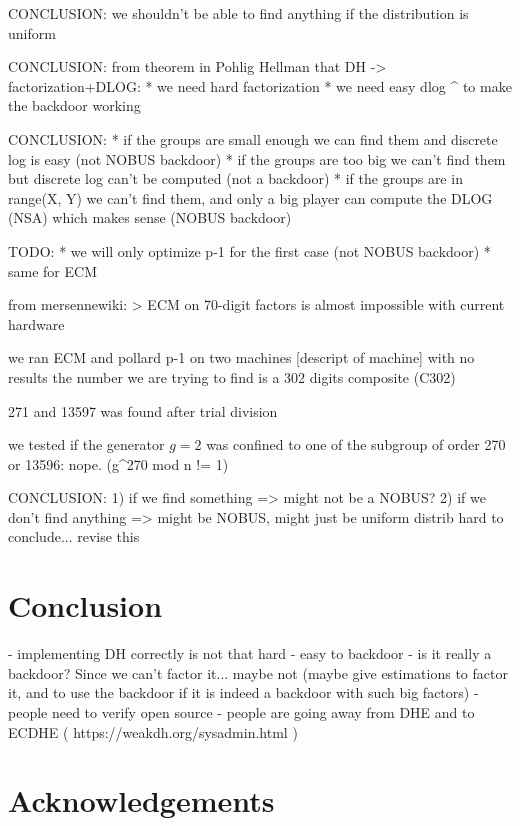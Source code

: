 \documentclass[a4paper,11pt]{article}
\begin{document}
CONCLUSION: we shouldn't be able to find anything if the distribution is uniform

CONCLUSION: from theorem in Pohlig Hellman that DH -> factorization+DLOG:
* we need hard factorization
* we need easy dlog
^ to make the backdoor working

CONCLUSION: 
* if the groups are small enough we can find them and discrete log is easy (not  NOBUS backdoor)
* if the groups are too big we can't find them but discrete log can't be computed (not a backdoor)
* if the groups are in range(X, Y) we can't find them, and only a big player can compute the DLOG (NSA) which makes sense (NOBUS backdoor)

TODO:
* we will only optimize p-1 for the first case (not NOBUS backdoor)
* same for ECM

from mersennewiki:
> ECM on 70-digit factors is almost impossible with current hardware

we ran ECM and pollard p-1 on two machines [descript of machine] with no results
the number we are trying to find is a 302 digits composite (C302)

271 and 13597 was found after trial division

we tested if the generator $g=2$ was confined to one of the subgroup of order 270 or 13596: nope. (g^270 mod n != 1)

CONCLUSION:
1) if we find something => might not be a NOBUS?
2) if we don't find anything => might be NOBUS, might just be uniform distrib
hard to conclude... revise this

\section{Conclusion}

- implementing DH correctly is not that hard
- easy to backdoor
- is it really a backdoor? Since we can't factor it... maybe not (maybe give estimations to factor it, and to use the backdoor if it is indeed a backdoor with such big factors)
- people need to verify open source
- people are going away from DHE and to ECDHE ( https://weakdh.org/sysadmin.html )
\newpage

\section*{Acknowledgements}


\newpage
\end{document}
